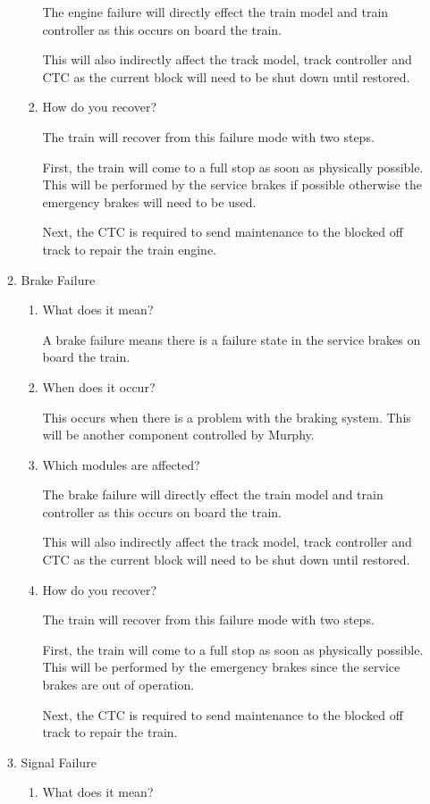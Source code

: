 \documentclass[11pt]{article}
\begin{document}
\begin{enumerate}
\begin{enumerate}
\begin{enumerate}
The engine failure will directly effect the train model and train controller as this occurs on board the train.

This will also indirectly affect the track model, track controller and CTC as the current block will need to be shut down until restored.
\item How do you recover?
\label{sec-3-1-4-3-1-4}

The train will recover from this failure mode with two steps.

First, the train will come to a full stop as soon as physically possible. This will be performed by the service brakes if possible otherwise the emergency brakes will need to be used.

Next, the CTC is required to send maintenance to the blocked off track to repair the train engine.
\end{enumerate}
\item Brake Failure
\label{sec-3-1-4-3-2}
\begin{enumerate}
\item What does it mean?
\label{sec-3-1-4-3-2-1}

A brake failure means there is a failure state in the service brakes on board the train. 
\item When does it occur?
\label{sec-3-1-4-3-2-2}

This occurs when there is a problem with the braking system. This will be another component controlled by Murphy.
\item Which modules are affected?
\label{sec-3-1-4-3-2-3}

The brake failure will directly effect the train model and train controller as this occurs on board the train.

This will also indirectly affect the track model, track controller and CTC as the current block will need to be shut down until restored.
\item How do you recover?
\label{sec-3-1-4-3-2-4}

The train will recover from this failure mode with two steps.

First, the train will come to a full stop as soon as physically possible. This will be performed by the emergency brakes since the service brakes are out of operation.

Next, the CTC is required to send maintenance to the blocked off track to repair the train.
\end{enumerate}
\item Signal Failure
\label{sec-3-1-4-3-3}
\begin{enumerate}
\item What does it mean?
\label{sec-3-1-4-3-3-1}


\end{enumerate}
\end{enumerate}
\end{enumerate}
\end{document}
